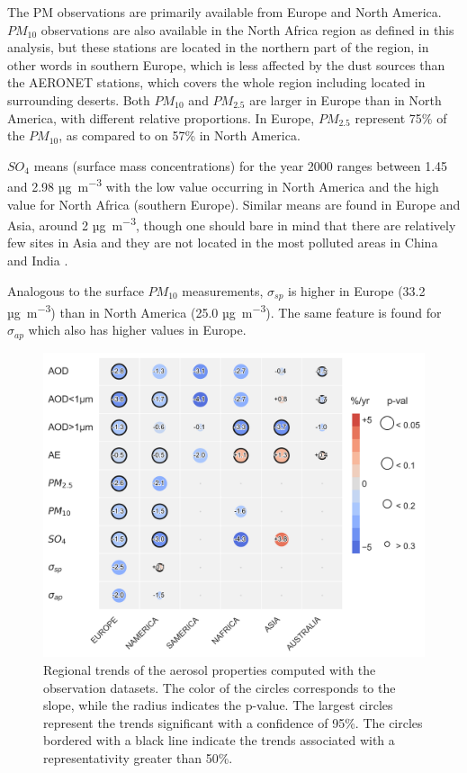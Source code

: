 \documentclass[journal abbreviation, manuscript]{copernicus}
\begin{document}
The PM observations are primarily available from Europe and North America. $PM_{10}$ observations are also available in the North Africa region as defined in this analysis, but these stations are  located in the northern part of the region, in other words in southern Europe, which is less affected by the dust sources than the AERONET stations, which covers the whole region including located in surrounding deserts. Both $PM_{10}$ and $PM_{2.5}$ are larger in Europe than in North America, with different relative proportions. In Europe, $PM_{2.5}$ represent 75\% of the $PM_{10}$, as compared to on 57\% in North America.

$SO_{4}$ means (surface mass concentrations) for the year 2000 ranges between 1.45 and 2.98 \unit{µg.m^{-3}} with the low value occurring in North America and the high value for North Africa (southern Europe). Similar means are found in Europe and Asia, around 2 \unit{µg.m^{-3}}, though one should bare in mind that there are relatively few sites in Asia and they are not located in the most polluted areas in China and India \citep{aas2019global}.

Analogous to the surface $PM_{10}$ measurements, $\sigma_{sp}$ is higher in Europe (33.2 \unit{µg.m^{-3}}) than in North America (25.0 \unit{µg.m^{-3}}). The same feature is found for $\sigma_{ap}$ which also has higher values in Europe.

\begin{figure}[t]
 \includegraphics[width=12cm]{../scripts/figs/heatmaps/OBS.png}
 \caption{Regional trends of the aerosol properties computed with the observation datasets. The color of the circles corresponds to the slope, while the radius indicates the p-value. The largest circles represent the trends significant with a confidence of 95\%. The circles bordered with a black line indicate the trends associated with a representativity greater than 50\%.}
 \label{fig:obs_trends}
\end{figure}
\end{document}
